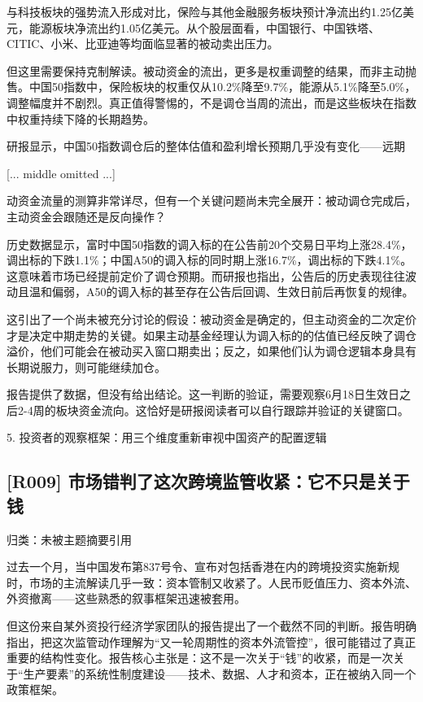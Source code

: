 \documentclass[11pt]{ctexart}
\begin{document}
与科技板块的强势流入形成对比，保险与其他金融服务板块预计净流出约1.25亿美元，能源板块净流出约1.05亿美元。从个股层面看，中国银行、中国铁塔、CITIC、小米、比亚迪等均面临显著的被动卖出压力。

但这里需要保持克制解读。被动资金的流出，更多是权重调整的结果，而非主动抛售。中国50指数中，保险板块的权重仅从10.2\%降至9.7\%，能源从5.1\%降至5.0\%，调整幅度并不剧烈。真正值得警惕的，不是调仓当周的流出，而是这些板块在指数中权重持续下降的长期趋势。

研报显示，中国50指数调仓后的整体估值和盈利增长预期几乎没有变化——远期

[... middle omitted ...]

动资金流量的测算非常详尽，但有一个关键问题尚未完全展开：被动调仓完成后，主动资金会跟随还是反向操作？

历史数据显示，富时中国50指数的调入标的在公告前20个交易日平均上涨28.4\%，调出标的下跌1.1\%；中国A50的调入标的同时期上涨16.7\%，调出标的下跌4.1\%。这意味着市场已经提前定价了调仓预期。而研报也指出，公告后的历史表现往往波动且温和偏弱，A50的调入标的甚至存在公告后回调、生效日前后再恢复的规律。

这引出了一个尚未被充分讨论的假设：被动资金是确定的，但主动资金的二次定价才是决定中期走势的关键。如果主动基金经理认为调入标的的估值已经反映了调仓溢价，他们可能会在被动买入窗口期卖出；反之，如果他们认为调仓逻辑本身具有长期说服力，则可能继续加仓。

报告提供了数据，但没有给出结论。这一判断的验证，需要观察6月18日生效日之后2-4周的板块资金流向。这恰好是研报阅读者可以自行跟踪并验证的关键窗口。

5. 投资者的观察框架：用三个维度重新审视中国资产的配置逻辑

\subsection{[R009] 市场错判了这次跨境监管收紧：它不只是关于钱}
{\small\color{refgray}归类：未被主题摘要引用}

过去一个月，当中国发布第837号令、宣布对包括香港在内的跨境投资实施新规时，市场的主流解读几乎一致：资本管制又收紧了。人民币贬值压力、资本外流、外资撤离——这些熟悉的叙事框架迅速被套用。

但这份来自某外资投行经济学家团队的报告提出了一个截然不同的判断。报告明确指出，把这次监管动作理解为“又一轮周期性的资本外流管控”，很可能错过了真正重要的结构性变化。报告核心主张是：这不是一次关于“钱”的收紧，而是一次关于“生产要素”的系统性制度建设——技术、数据、人才和资本，正在被纳入同一个政策框架。
\end{document}
